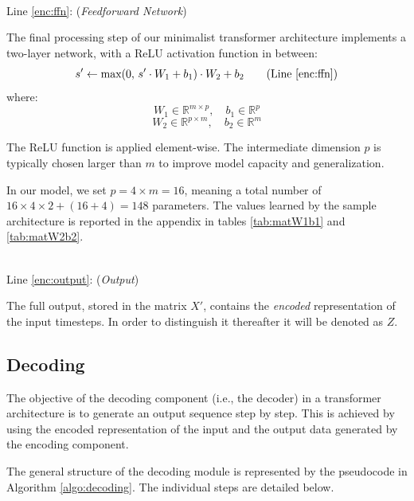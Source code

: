 \documentclass[algorithms,article,submit,pdftex,moreauthors]{Definitions/mdpi}
\begin{document}
~\\Line \ref{enc:ffn}: (\textit{Feedforward Network})

The final processing step of our minimalist transformer architecture implements a two-layer network, with a ReLU activation function in between:
\begin{equation}
    s' \leftarrow \text{max}(0,\,s'\cdot W_1 + b_1) \cdot W_2 + b_2
\tag{Line \ref{enc:ffn}}
\end{equation}
where:
$$
    W_1 \in \mathbb{R}^{m \times p},\quad
    b_1 \in \mathbb{R}^{p}
$$ $$
    W_2 \in \mathbb{R}^{p \times m},\quad
    b_2 \in \mathbb{R}^m
$$

The ReLU function is applied element-wise. The intermediate dimension $p$ is typically chosen larger than $m$ to improve model capacity and generalization. 

In our model, we set $p = 4 \times m = 16$, meaning a total number of $16 \times 4 \times 2 + (16 + 4) = 148$ parameters.
The values learned by the sample architecture is reported in the appendix in tables \ref{tab:matW1b1} and \ref{tab:matW2b2}.

~\\Line \ref{enc:output}: (\textit{Output})

The full output, stored in the matrix $X'$, contains the \textit{encoded} representation of the input timesteps. In order to distinguish it thereafter it will be denoted as $Z$. 

\subsection{Decoding} \label{subsec:decoding}

The objective of the decoding component (i.e., the decoder) in a transformer architecture is to generate an output sequence step by step. This is achieved by using the encoded representation of the input and the output data generated by the encoding component.

The general structure of the decoding module is represented by the pseudocode in Algorithm \ref{algo:decoding}. The individual steps are detailed below.
\end{document}
